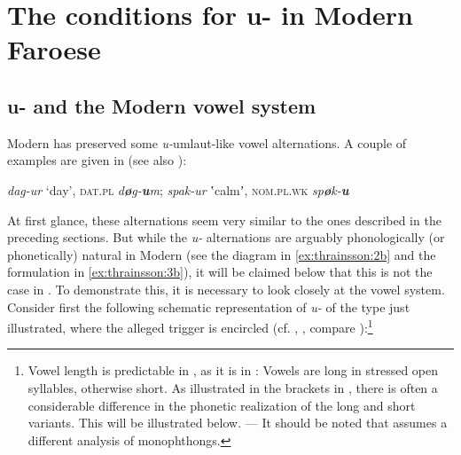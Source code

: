 \documentclass[output=paper,
modfonts
]{LSP/langsci}
\begin{document}
\section{The conditions for {u}- in Modern
Faroese}

\subsection{{u-} and the Modern  vowel system}

Modern  has preserved some \emph{u-}umlaut-like vowel
alternations. A couple of examples are given in  (see also
\citealt[78, 100, passim]{thrainsson2012}):

\begin{exe}
\ex \label{ex:thrainsson:11} 	\emph{dag-ur} `day', \textsc{dat.pl}
	\emph{d\textbf{ø}g-\textbf{u}m}; 
	\emph{spak-ur} ʽcalmʼ, \textsc{nom.pl.wk}
	\emph{sp\textbf{ø}k-\textbf{u}}
\z

\noindent At first glance, these alternations seem very similar to the 
ones described in the preceding sections. But while the \emph{u-}
alternations are arguably phonologically (or phonetically) natural in
Modern  (see the diagram in \ref{ex:thrainsson:2b} and the formulation in \ref{ex:thrainsson:3b}),
it will be claimed below that this is not the case in . To
demonstrate this, it is necessary to look closely at the  vowel
system. Consider first the following schematic representation of 
\emph{u-} of the type just illustrated, where the alleged 
trigger is encircled (cf. \citealt[98]{thrainsson2011}, \citealt[33]{thrainsson2012}, compare \citealt[248--250]{arnason2011}):\footnote{Vowel length
  is predictable in , as it is in : Vowels are long in
  stressed open syllables, otherwise short. As illustrated in the
  brackets in , there is often a considerable difference in the
  phonetic realization of the long and short variants. This will be
  illustrated below. --- It should be noted that \citet[76]{arnason2011}
  assumes a different analysis of  monophthongs.}


\end{exe}
\end{document}
